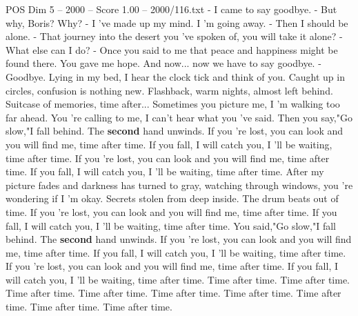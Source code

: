 \begin{textsample}{POS Dim 5 – 2000 – Score 1.00 – 2000/116.txt}  \label{ex:f5_pos_003}
- I came to say goodbye. - But why, Boris?
Why? - I 've made up my mind.
I 'm going away. - Then I should be alone. - That journey into the desert you 've spoken of, you will take it alone? - What else can I do? - Once you said to me that peace and happiness might be found there.
You gave me hope.
And now... now we have to say goodbye. - Goodbye.
Lying in my bed, I hear the clock tick and think of you.
Caught up in circles, confusion is nothing new.
Flashback, warm nights, almost left behind.
Suitcase of memories, time after...
Sometimes you picture me, I 'm walking too far ahead.
You 're calling to me, I can't hear what you 've said.
Then you say,"Go slow,"I fall behind.
The \textbf{second} hand unwinds.
If you 're lost, you can look and you will find me, time after time.
If you fall, I will catch you, I 'll be waiting, time after time.
If you 're lost, you can look and you will find me, time after time.
If you fall, I will catch you, I 'll be waiting, time after time.
After my picture fades and darkness has turned to gray, watching through windows, you 're wondering if I 'm okay.
Secrets stolen from deep inside.
The drum beats out of time.
If you 're lost, you can look and you will find me, time after time.
If you fall, I will catch you, I 'll be waiting, time after time.
You said,"Go slow,"I fall behind.
The \textbf{second} hand unwinds.
If you 're lost, you can look and you will find me, time after time.
If you fall, I will catch you, I 'll be waiting, time after time.
If you 're lost, you can look and you will find me, time after time.
If you fall, I will catch you, I 'll be waiting, time after time.
Time after time.
Time after time.
Time after time.
Time after time.
Time after time.
Time after time.
Time after time.
Time after time.
Time after time.

\end{textsample}
